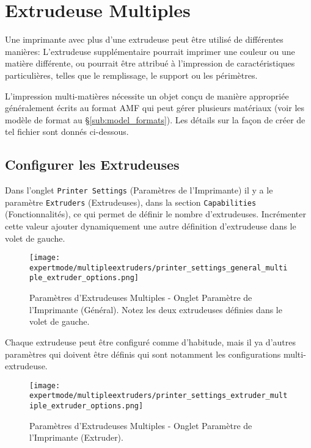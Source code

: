 
\section{Extrudeuse Multiples} %
\label{sec:multiple_extruders}

Une imprimante avec plus d'une extrudeuse peut être utilisé de différentes manières: L'extrudeuse supplémentaire pourrait imprimer une couleur ou une matière différente, ou pourrait être attribué à l'impression de caractéristiques particulières, telles que le remplissage, le support ou les périmètres.

L'impression multi-matières nécessite un objet conçu de manière appropriée généralement écrits au format AMF qui peut gérer plusieurs matériaux (voir les modèle de format au §\ref{sub:model_formats}).  Les détails sur la façon de créer de tel fichier sont donnés ci-dessous.


\subsection{Configurer les Extrudeuses} %
\label{sub:configuring_extruders}

Dans l'onglet \texttt{Printer Settings} (Paramètres de l'Imprimante) il y a le paramètre \texttt{Extruders} (Extrudeuses), dans la section \texttt{Capabilities} (Fonctionnalités), ce qui permet de définir le nombre d'extrudeuses. Incrémenter cette valeur ajouter dynamiquement une autre définition d'extrudeuse dans le volet de gauche.

\begin{figure}[H]
\centering
\texttt{[image: expertmode/multipleextruders/printer\_settings\_general\_multiple\_extruder\_options.png]}
\caption{Paramètres d'Extrudeuses Multiples - Onglet Paramètre de l'Imprimante (Général).  Notez les deux extrudeuses définies dans le volet de gauche.}
\label{fig:printer_settings_general_multiple_extruder_options}
\end{figure}

Chaque extrudeuse peut être configuré comme d'habitude, mais il ya d'autres paramètres qui doivent être définis qui sont notamment les configurations multi-extrudeuse.

\begin{figure}[H]
\centering
\texttt{[image: expertmode/multipleextruders/printer\_settings\_extruder\_multiple\_extruder\_options.png]}
\caption{Paramètres d'Extrudeuses Multiples - Onglet Paramètre de l'Imprimante (Extruder).}
\label{fig:printer_settings_extruder_multiple_extruder_options}
\end{figure}

